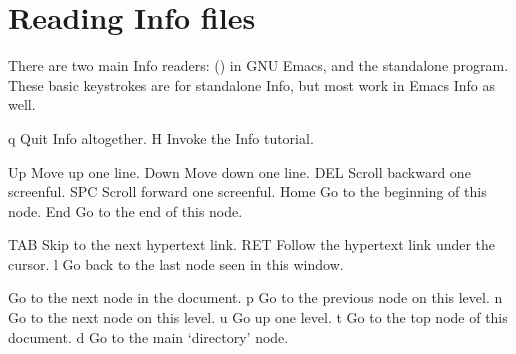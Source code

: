 



\chapter{Reading Info files}

There are two main Info readers:  () in GNU
Emacs, and the standalone  program.  These basic keystrokes
are for standalone Info, but most work in Emacs Info as well.

\begininfokeys %
\infokey q           Quit Info altogether.\cr
\infokey H           Invoke the Info tutorial.\cr

\infokey Up          Move up one line.\cr
\infokey Down        Move down one line.\cr
\infokey DEL         Scroll backward one screenful.\cr
\infokey SPC         Scroll forward one screenful.\cr
\infokey Home        Go to the beginning of this node.\cr
\infokey End         Go to the end of this node.\cr

\infokey TAB         Skip to the next hypertext link.\cr
\infokey RET         Follow the hypertext link under the cursor.\cr
\infokey l           Go back to the last node seen in this window.\cr

           Go to the next node in the document.\cr
\infokey p           Go to the previous node on this level.\cr
\infokey n           Go to the next node on this level.\cr
\infokey u           Go up one level.\cr
\infokey t           Go to the top node of this document.\cr
\infokey d           Go to the main `directory' node.\cr

